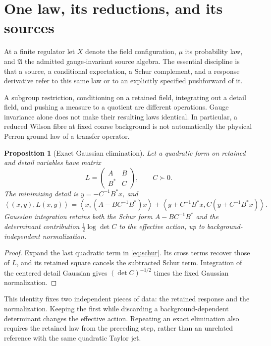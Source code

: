 \documentclass[11pt,oneside,openany]{book}
\newtheorem{proposition}[proposition]{Proposition}
\theoremstyle{definition}
\theoremstyle{remark}
\newcommand{\ip}[2]{\left\langle#1,#2\right\rangle}
\begin{document}
\section{One law, its reductions, and its sources}
At a finite regulator let $X$ denote the field configuration, $\mu$ its probability law, and $\mathfrak A$ the admitted gauge-invariant source algebra. The essential discipline is that a source, a conditional expectation, a Schur complement, and a response derivative refer to this same law or to an explicitly specified pushforward of it.

A subgroup restriction, conditioning on a retained field, integrating out a detail field, and pushing a measure to a quotient are different operations. Gauge invariance alone does not make their resulting laws identical. In particular, a reduced Wilson fibre at fixed coarse background is not automatically the physical Perron ground law of a transfer operator.

\begin{proposition}[Exact Gaussian elimination]\label{prop:schur}
Let a quadratic form on retained and detail variables have matrix
\[
L=\begin{pmatrix}A&B\\B^*&C\end{pmatrix},\qquad C\succ0.
\]
The minimizing detail is $y=-C^{-1}B^*x$, and
\begin{equation}\label{eq:schur}
\ip{(x,y)}{L(x,y)}
=\ip{x}{(A-BC^{-1}B^*)x}
 +\ip{y+C^{-1}B^*x}{C(y+C^{-1}B^*x)}.
\end{equation}
Gaussian integration retains both the Schur form $A-BC^{-1}B^*$ and the determinant contribution $\frac12\log\det C$ to the effective action, up to background-independent normalization.
\end{proposition}
\begin{proof}
Expand the last quadratic term in \cref{eq:schur}. Its cross terms recover those of $L$, and its retained square cancels the subtracted Schur term. Integration of the centered detail Gaussian gives $(\det C)^{-1/2}$ times the fixed Gaussian normalization.
\end{proof}

This identity fixes two independent pieces of data: the retained response and the normalization. Keeping the first while discarding a background-dependent determinant changes the effective action. Repeating an exact elimination also requires the retained law from the preceding step, rather than an unrelated reference with the same quadratic Taylor jet.
\end{document}
